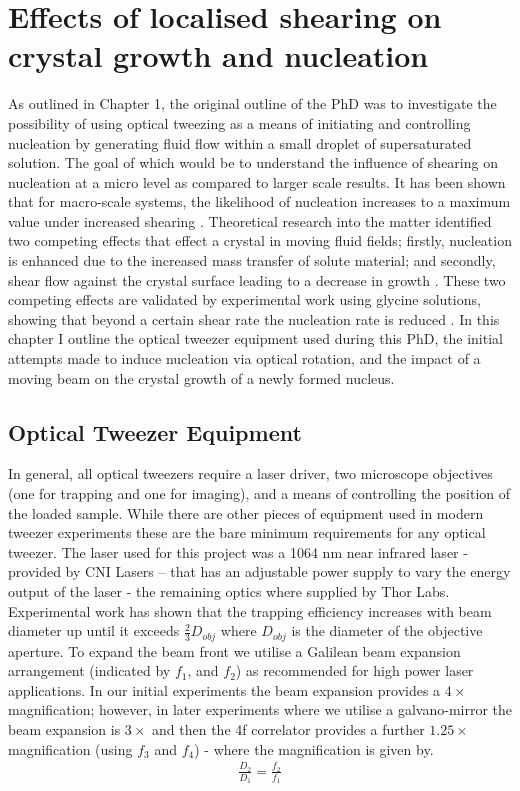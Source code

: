 \chapter{Effects of localised shearing on crystal growth and nucleation}
As outlined in Chapter 1, the original outline of the PhD was to investigate 
the possibility of using optical tweezing as a means of initiating and 
controlling nucleation by generating fluid flow within a small droplet of 
supersaturated solution. The goal of which would be to understand the 
influence of shearing on nucleation at a micro level as compared to larger 
scale results. It has been shown that for macro-scale systems, the likelihood 
of nucleation increases to a maximum value under increased shearing 
\cite{Debuysschere2023, Mura2016}. Theoretical research into the matter 
identified two competing effects that effect a crystal in moving fluid fields; 
firstly, nucleation is enhanced due to the increased mass transfer of solute 
material; and secondly, shear flow against the crystal surface leading to a 
decrease in growth \cite{Mura2016}. These two competing effects are validated 
by experimental work using glycine solutions, showing that beyond a certain 
shear rate the nucleation rate is reduced \cite{Debuysschere2023}. In this 
chapter I outline the optical tweezer equipment used during this PhD, the 
initial attempts made to induce nucleation via optical rotation, and the 
impact of a moving beam on the crystal growth of a newly formed nucleus.
\section{Optical Tweezer Equipment}
In general, all optical tweezers require a laser driver, two
microscope objectives (one for trapping and one for imaging),
and a means of controlling the position of the loaded sample. 
While there are other pieces of equipment used in modern tweezer
experiments these are the bare minimum requirements for any 
optical tweezer. The laser used for this project was a 1064 
nm near infrared laser - provided by CNI Lasers – that has 
an adjustable power supply to vary the energy output of the 
laser - the remaining optics where supplied by Thor Labs.
Experimental work has shown that the trapping efficiency 
increases with beam diameter up until it exceeds $\frac{2}{3}D_{obj}$ 
\cite{kim2003dependence} where $D_{obj}$ is the diameter
of the objective aperture. To expand the beam front we 
utilise a Galilean beam expansion arrangement (indicated 
by $f_1$, and $f_2$) as recommended for high power laser 
applications. In our initial experiments the beam expansion 
provides a $4\times$ magnification; however, in later experiments 
where we utilise a galvano-mirror the beam expansion is $3\times$ 
and then the 4f correlator provides a further $1.25\times$ magnification 
(using $f_3$ and $f_4$) - where the magnification is given by.
\begin{align}
	\frac{D_2}{D_1} = \frac{f_2}{f_1}
\end{align}

